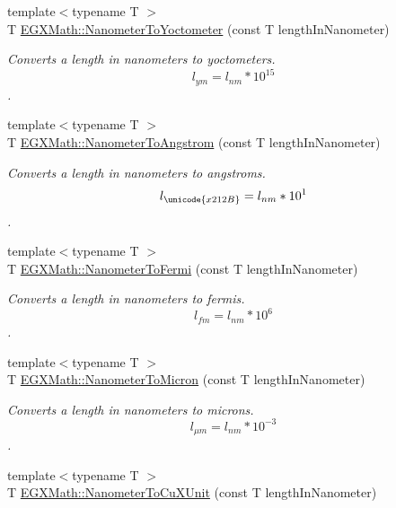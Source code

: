 \begin{DoxyCompactItemize}
{\footnotesize template$<$typename T $>$ }\\T \mbox{\hyperlink{group___e_g_x_math-_conversions-_length_conversions-_s_i-_nanometer-_s_i_gab447c3aa3d215a1030a63e28f9aca1c1}{E\+G\+X\+Math\+::\+Nanometer\+To\+Yoctometer}} (const T length\+In\+Nanometer)
\begin{DoxyCompactList}\small\item\em Converts a length in nanometers to yoctometers. \[ l_{ym}=l_{nm} * 10^{15} \]. \end{DoxyCompactList}\item 
{\footnotesize template$<$typename T $>$ }\\T \mbox{\hyperlink{group___e_g_x_math-_conversions-_length_conversions-_s_i-_nanometer-_non-_s_i_ga7e2062d4cc1a422e54da597c4413efb1}{E\+G\+X\+Math\+::\+Nanometer\+To\+Angstrom}} (const T length\+In\+Nanometer)
\begin{DoxyCompactList}\small\item\em Converts a length in nanometers to angstroms. \[ l_{\unicode{x212B}}=l_{nm} * 10^{1} \]. \end{DoxyCompactList}\item 
{\footnotesize template$<$typename T $>$ }\\T \mbox{\hyperlink{group___e_g_x_math-_conversions-_length_conversions-_s_i-_nanometer-_non-_s_i_ga9b708f83b519464f5ebb912bcaaf747d}{E\+G\+X\+Math\+::\+Nanometer\+To\+Fermi}} (const T length\+In\+Nanometer)
\begin{DoxyCompactList}\small\item\em Converts a length in nanometers to fermis. \[ l_{fm}=l_{nm} * 10^{6} \]. \end{DoxyCompactList}\item 
{\footnotesize template$<$typename T $>$ }\\T \mbox{\hyperlink{group___e_g_x_math-_conversions-_length_conversions-_s_i-_nanometer-_non-_s_i_ga278b008cafd5027568e16cbc8af7fb6a}{E\+G\+X\+Math\+::\+Nanometer\+To\+Micron}} (const T length\+In\+Nanometer)
\begin{DoxyCompactList}\small\item\em Converts a length in nanometers to microns. \[ l_{\mu m}=l_{nm} * 10^{-3} \]. \end{DoxyCompactList}\item 
{\footnotesize template$<$typename T $>$ }\\T \mbox{\hyperlink{group___e_g_x_math-_conversions-_length_conversions-_s_i-_nanometer-_non-_s_i_ga59399657caa5a9c81df2ffbe1ff7683c}{E\+G\+X\+Math\+::\+Nanometer\+To\+Cu\+X\+Unit}} (const T length\+In\+Nanometer)

\end{DoxyCompactItemize}
